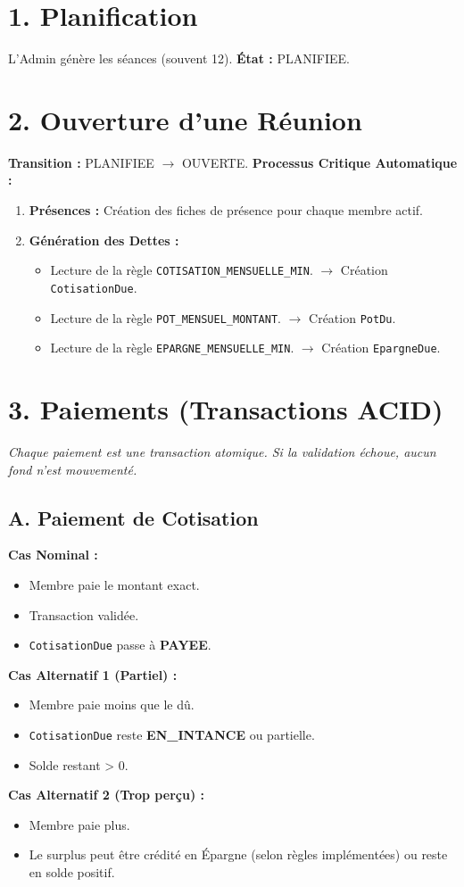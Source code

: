 \documentclass[12pt,a4paper]{report}
\begin{document}
\section{1. Planification}
L'Admin génère les séances (souvent 12).
\textbf{État :} PLANIFIEE.

\section{2. Ouverture d'une Réunion}
\textbf{Transition :} PLANIFIEE $\rightarrow$ OUVERTE.
\textbf{Processus Critique Automatique :}
\begin{enumerate}
    \item \textbf{Présences :} Création des fiches de présence pour chaque membre actif.
    \item \textbf{Génération des Dettes :}
    \begin{itemize}
        \item Lecture de la règle \texttt{COTISATION\_MENSUELLE\_MIN}. $\rightarrow$ Création \texttt{CotisationDue}.
        \item Lecture de la règle \texttt{POT\_MENSUEL\_MONTANT}. $\rightarrow$ Création \texttt{PotDu}.
        \item Lecture de la règle \texttt{EPARGNE\_MENSUELLE\_MIN}. $\rightarrow$ Création \texttt{EpargneDue}.
    \end{itemize}
\end{enumerate}

\section{3. Paiements (Transactions ACID)}
\textit{Chaque paiement est une transaction atomique. Si la validation échoue, aucun fond n'est mouvementé.}

\subsection{A. Paiement de Cotisation}
\textbf{Cas Nominal :}
\begin{itemize}
    \item Membre paie le montant exact.
    \item Transaction validée.
    \item \texttt{CotisationDue} passe à \textbf{PAYEE}.
\end{itemize}
\textbf{Cas Alternatif 1 (Partiel) :}
\begin{itemize}
    \item Membre paie moins que le dû.
    \item \texttt{CotisationDue} reste \textbf{EN\_INTANCE} ou partielle.
    \item Solde restant > 0.
\end{itemize}
\textbf{Cas Alternatif 2 (Trop perçu) :}
\begin{itemize}
    \item Membre paie plus.
    \item Le surplus peut être crédité en Épargne (selon règles implémentées) ou reste en solde positif.
\end{itemize}
\end{document}
